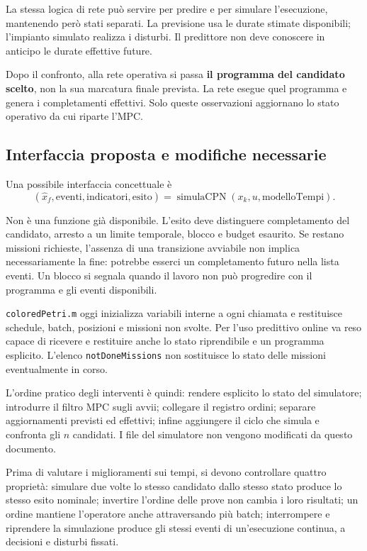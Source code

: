 \documentclass[a4paper,11pt]{article}
\begin{document}
La stessa logica di rete può servire per predire e per simulare l'esecuzione, mantenendo però stati separati. La previsione usa le durate stimate disponibili; l'impianto simulato realizza i disturbi. Il predittore non deve conoscere in anticipo le durate effettive future.

Dopo il confronto, alla rete operativa si passa \textbf{il programma del candidato scelto}, non la sua marcatura finale prevista. La rete esegue quel programma e genera i completamenti effettivi. Solo queste osservazioni aggiornano lo stato operativo da cui riparte l'MPC.

\subsection{Interfaccia proposta e modifiche necessarie}

Una possibile interfaccia concettuale è
\[
    (\widehat x_f,\mathrm{eventi},\mathrm{indicatori},\mathrm{esito})
      =\operatorname{simulaCPN}(x_k,u,\mathrm{modelloTempi}).
\]

Non è una funzione già disponibile. L'esito deve distinguere completamento del candidato, arresto a un limite temporale, blocco e budget esaurito. Se restano missioni richieste, l'assenza di una transizione avviabile non implica necessariamente la fine: potrebbe esserci un completamento futuro nella lista eventi. Un blocco si segnala quando il lavoro non può progredire con il programma e gli eventi disponibili.

\texttt{coloredPetri.m} oggi inizializza variabili interne a ogni chiamata e restituisce schedule, batch, posizioni e missioni non svolte. Per l'uso predittivo online va reso capace di ricevere e restituire anche lo stato riprendibile e un programma esplicito. L'elenco \texttt{notDoneMissions} non sostituisce lo stato delle missioni eventualmente in corso.

L'ordine pratico degli interventi è quindi: rendere esplicito lo stato del simulatore; introdurre il filtro MPC sugli avvii; collegare il registro ordini; separare aggiornamenti previsti ed effettivi; infine aggiungere il ciclo che simula e confronta gli $n$ candidati. I file del simulatore non vengono modificati da questo documento.

Prima di valutare i miglioramenti sui tempi, si devono controllare quattro proprietà: simulare due volte lo stesso candidato dallo stesso stato produce lo stesso esito nominale; invertire l'ordine delle prove non cambia i loro risultati; un ordine mantiene l'operatore anche attraversando più batch; interrompere e riprendere la simulazione produce gli stessi eventi di un'esecuzione continua, a decisioni e disturbi fissati.
\end{document}

